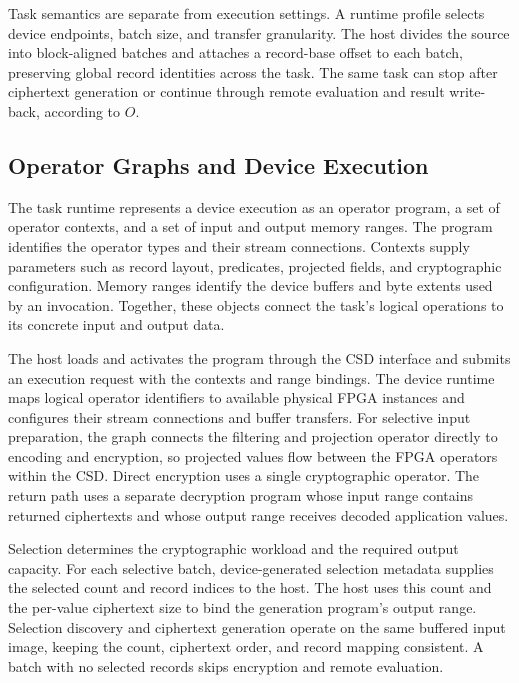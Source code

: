 Task semantics are separate from execution settings. A runtime profile selects device endpoints, batch size, and transfer granularity. The host divides the source into block-aligned batches and attaches a record-base offset to each batch, preserving global record identities across the task. The same task can stop after ciphertext generation or continue through remote evaluation and result write-back, according to $O$.

\subsection{Operator Graphs and Device Execution}
\label{subsec:operator-execution}

The task runtime represents a device execution as an operator program, a set of operator contexts, and a set of input and output memory ranges. The program identifies the operator types and their stream connections. Contexts supply parameters such as record layout, predicates, projected fields, and cryptographic configuration. Memory ranges identify the device buffers and byte extents used by an invocation. Together, these objects connect the task's logical operations to its concrete input and output data.

The host loads and activates the program through the CSD interface and submits an execution request with the contexts and range bindings. The device runtime maps logical operator identifiers to available physical FPGA instances and configures their stream connections and buffer transfers. For selective input preparation, the graph connects the filtering and projection operator directly to encoding and encryption, so projected values flow between the FPGA operators within the CSD. Direct encryption uses a single cryptographic operator. The return path uses a separate decryption program whose input range contains returned ciphertexts and whose output range receives decoded application values.

Selection determines the cryptographic workload and the required output capacity. For each selective batch, device-generated selection metadata supplies the selected count and record indices to the host. The host uses this count and the per-value ciphertext size to bind the generation program's output range. Selection discovery and ciphertext generation operate on the same buffered input image, keeping the count, ciphertext order, and record mapping consistent. A batch with no selected records skips encryption and remote evaluation.

